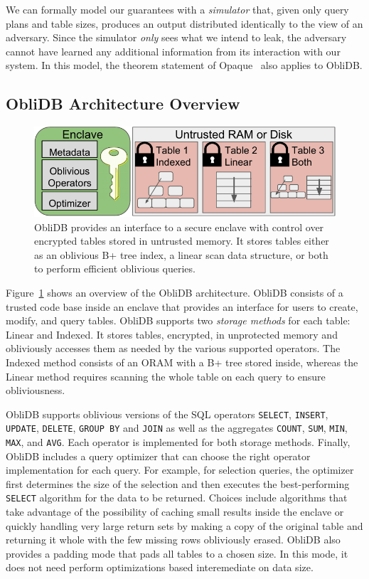 \documentclass[letterpaper,twocolumn,10pt]{article}
\def\name/{ObliDB}
\begin{document}
We can formally model our guarantees with a \emph{simulator} that, given only query plans and table sizes, produces an output distributed identically to the view of an adversary. Since the simulator \emph{only} sees what we intend to leak, the adversary cannot have learned any additional information from its interaction with our system. In this model, the theorem statement of Opaque~\cite{ZDB+17} also applies to \name/.

\subsection{\name/ Architecture Overview}
\begin{figure}
\centering
\includegraphics[width=\linewidth]{figure_revised.pdf}
\caption{\small \name/ provides an interface to a secure enclave with control over encrypted tables stored in untrusted memory. It stores tables either as an oblivious B+ tree index, a linear scan data structure, or both to perform efficient oblivious queries.}
\label{arch}
\end{figure}
Figure~\ref{arch} shows an overview of the \name/ architecture. \name/ consists of a trusted code base inside an enclave that provides an interface for users to create, modify, and query tables. \name/ supports two \emph{storage methods} for each table: Linear and Indexed. It stores tables, encrypted, in unprotected memory and obliviously accesses them as needed by the various supported operators. The Indexed method consists of an ORAM with a B+ tree stored inside, whereas the Linear method requires scanning the whole table on each query to ensure obliviousness.

  \name/ supports oblivious versions of the SQL operators \texttt{SELECT}, \texttt{INSERT}, \texttt{UPDATE}, \texttt{DELETE}, \texttt{GROUP BY} and \texttt{JOIN} as well as the aggregates \texttt{COUNT}, \texttt{SUM}, \texttt{MIN}, \texttt{MAX}, and \texttt{AVG}. Each operator is implemented for both storage methods. Finally, ObliDB includes a query optimizer that can choose the right operator implementation for each query. For example, for selection queries, the optimizer first determines the size of the selection and then executes the best-performing \texttt{SELECT} algorithm for the data to be returned. Choices include algorithms that take advantage of the possibility of caching small results inside the enclave or quickly handling very large return sets by making a copy of the original table and returning it whole with the few missing rows obliviously erased. \name/ also provides a padding mode that pads all tables to a chosen size. In this mode, it does not need perform optimizations based interemediate on data size.
\end{document}
